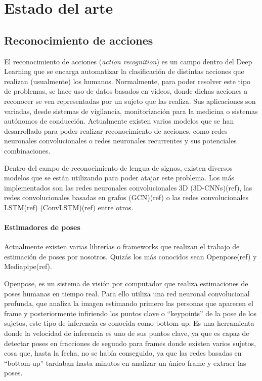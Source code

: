 \documentclass{article} %
\begin{document}
\noindent \textbf{}

\noindent 


\section{  Estado del arte}


\subsection{ Reconocimiento de acciones}

\noindent El reconocimiento de acciones (\textit{action recognition}) es un campo dentro del Deep Learning que se encarga automatizar la clasificaci\'{o}n de distintas acciones que realizan (usualmente) los humanos. Normalmente, para poder resolver este tipo de problemas, se hace uso de datos basados en v\'{i}deos, donde dichas acciones a reconocer se ven representadas por un sujeto que las realiza. Sus aplicaciones son variadas, desde sistemas de vigilancia, monitorizaci\'{o}n para la medicina o sistemas aut\'{o}nomos de conducci\'{o}n. Actualmente existen varios modelos que se han desarrollado para poder realizar reconocimiento de acciones, como redes neuronales convolucionales o redes neuronales recurrentes y sus potenciales combinaciones.

\noindent 

\noindent Dentro del campo de reconocimiento de lengua de signos, existen diversos modelos que se est\'{a}n utilizando para poder atajar este problema. Los m\'{a}s implementados son las redes neuronales convolucionales 3D (3D-CNNs)(ref), las redes convolucionales basadas en grafos (GCN)(ref) o las redes convolucionales LSTM(ref) (ConvLSTM)(ref) entre otros.


\paragraph{ Estimadores de poses}

\noindent Actualmente existen varias librer\'{i}as o frameworks que realizan el trabajo de estimaci\'{o}n de poses por nosotros. Quiz\'{a}s los m\'{a}s conocidos sean Openpose(ref) y Mediapipe(ref). 

\noindent 

\noindent Openpose, es un sistema de visi\'{o}n por computador que realiza estimaciones de poses humanas en tiempo real. Para ello utiliza una red neuronal convolucional profunda, que analiza la imagen estimando primero las personas que aparecen el frame y posteriormente infiriendo los puntos clave o ``keypoints'' de la pose de los sujetos, este tipo de inferencia es conocida como bottom-up. Es una herramienta donde la velocidad de inferencia es uno de sus puntos clave, ya que es capaz de detectar poses en fracciones de segundo para frames donde existen varios sujetos, cosa que, hasta la fecha, no se hab\'{i}a conseguido, ya que las redes basadas en ``bottom-up'' tardaban hasta minutos en analizar un \'{u}nico frame y extraer las poses. 
\end{document}
